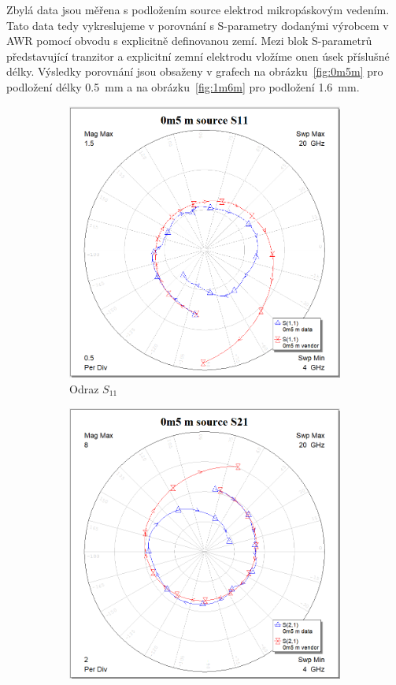\documentclass[11pt,a4paper]{article}
\begin{document}
Zbylá data jsou měřena s podložením source elektrod mikropáskovým vedením. Tato data tedy vykreslujeme v porovnání s S-parametry dodanými výrobcem v AWR pomocí obvodu s explicitně definovanou zemí. Mezi blok S-parametrů představující tranzitor a explicitní zemní elektrodu vložíme onen úsek příslušné délky. Výsledky porovnání jsou obsaženy v grafech na obrázku~\ref{fig:0m5m} pro podložení délky 0.5~mm a na obrázku~\ref{fig:1m6m} pro podložení 1.6~mm.
\begin{figure}[!ht]
    \centering
\begin{subfigure}{0.45\textwidth}
    \centering
    \includegraphics[width=\textwidth]{src/0m5m-S11.png}
    \caption{Odraz $S_{11}$}
\end{subfigure}
\begin{subfigure}{0.45\textwidth}
    \centering
    \includegraphics[width=\textwidth]{src/0m5m-S21.png}

\end{subfigure}
\end{figure}
\end{document}
